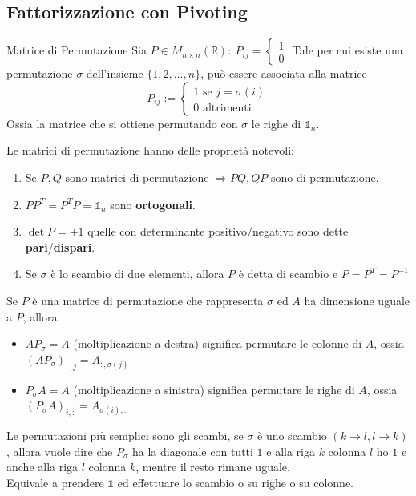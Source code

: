 \documentclass{article}
\begin{document}
\subsection{Fattorizzazione con Pivoting}
\begin{defi}{Matrice di Permutazione}{}
    Sia $P\in M_{n\times n}(\mathbb R):\ P_{ij}=\begin{cases}
            1 \\0
        \end{cases}$ Tale per cui esiste una permutazione $\sigma$ dell'insieme $\{1,2,\dots,n\}$, può essere associata alla matrice $$P_{ij}:=\begin{cases}
            1\text{ se } j=\sigma(i) \\
            0\text{ altrimenti}
        \end{cases}$$
    Ossia la matrice che si ottiene permutando con $\sigma$ le righe di $\mathbb 1_n$.
\end{defi}
Le matrici di permutazione hanno delle proprietà notevoli:
\begin{enumerate}
    \item Se $P,Q$ sono matrici di permutazione $\Rightarrow PQ,QP$ sono di permutazione.
    \item $PP^T=P^TP=\mathbb 1_n$ sono \textbf{ortogonali}.
    \item $\det P=\pm 1$ quelle con determinante positivo/negativo sono dette \textbf{pari}/\textbf{dispari}.
    \item Se $\sigma$ è lo scambio di due elementi, allora $P$ è detta di scambio e $P=P^T=P^{-1}$
\end{enumerate}

Se $P$ è una matrice di permutazione che rappresenta $\sigma$ ed $A$ ha dimensione uguale a $P$, allora
\begin{itemize}
    \item $AP_\sigma=A$ (moltiplicazione a destra) significa permutare le colonne di $A$, ossia $\left(AP_\sigma\right)_{:,j}=A_{:,\sigma(j)}$
    \item $P_\sigma A=A$ (moltiplicazione a sinistra) significa permutare le righe di $A$, ossia $\left(P_\sigma A\right)_{i,:}=A_{\sigma(i),:}$

\end{itemize}

Le permutazioni più semplici sono gli scambi, se $\sigma$ è uno scambio $\left(k\to l,l\to k\right)$, allora
vuole dire che $P_\sigma$ ha la diagonale con tutti $1$ e alla riga $k$ colonna $l$ ho $1$ e anche alla riga $l$ colonna $k$, mentre il resto rimane uguale.\\
Equivale a prendere $\mathbb 1$ ed effettuare lo scambio o su righe o su colonne.
\end{document}
